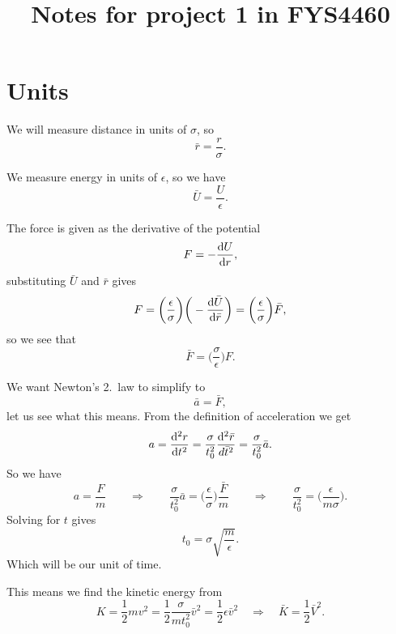 \documentclass[a4paper, 11pt, notitlepage, english]{article}
\author{}
\title{Notes for project 1 in FYS4460}
\renewcommand{\d}{{\rm d}}
\newcommand{\eps}{\epsilon}
\begin{document}
\section*{Units}

We will measure distance in units of $\sigma$, so
$$\bar{r} = \frac{r}{\sigma}.$$

We measure energy in units of $\eps$, so we have
$$\bar{U} = \frac{U}{\eps}.$$

The force is given as the derivative of the potential
$$F = -\frac{\d U}{\d r},$$
substituting $\bar U$ and $\bar r$ gives
$$F = \bigg(\frac{\eps}{\sigma}\bigg)\bigg(-\frac{\d \bar{U}}{\d \bar{r}}\bigg) = \bigg(\frac{\eps}{\sigma}\bigg)\bar{F},$$
so we see that
$$\bar{F} = \bigg(\frac{\sigma}{\eps}\bigg)F.$$

We want Newton's 2.\ law to simplify to
$$\bar{a} = \bar{F},$$
let us see what this means. From the definition of acceleration we get
$$a = \frac{\d^2 r}{\d t^2} = \frac{\sigma}{t_0^2} \frac{\d^2 \bar{r}}{d\bar{t}^2} = \frac{\sigma}{t_0^2}\bar{a}.$$ 
So we have
$$a = \frac{F}{m} \qquad \Rightarrow \qquad  \frac{\sigma}{t_0^2}\bar{a} = \bigg(\frac{\eps}{\sigma}\bigg)\frac{\bar{F}}{m} \qquad \Rightarrow \qquad \frac{\sigma}{t_0^2} = \bigg(\frac{\eps}{m\sigma}\bigg).$$
Solving for $t$ gives
$$t_0 = \sigma\sqrt{\frac{m}{\eps}}.$$
Which will be our unit of time.

This means we find the kinetic energy from
$$K = \frac{1}{2}mv^2 = \frac{1}{2}\frac{\sigma}{mt_0^2}\bar{v}^2 = \frac{1}{2}\eps \bar{v}^2 \quad \Rightarrow \quad \bar{K} = \frac{1}{2}\bar{V}^2.$$
\end{document}

